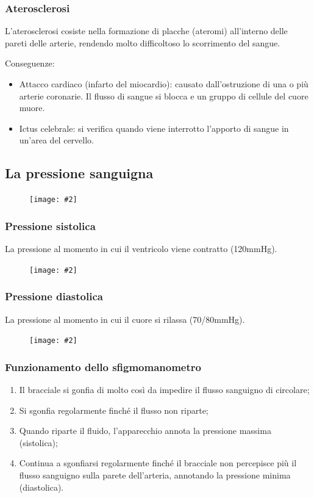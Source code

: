 \documentclass{article}
\newcommand{\cfig}[2]{
    \phantom{}
    \begin{figure}[ht!]
        \begin{center}
            \texttt{[image: \#2]}
        \end{center}
    \end{figure}
}
\begin{document}
\subsubsection{Aterosclerosi}
L'aterosclerosi cosiste nella formazione di placche (ateromi) all'interno delle pareti delle
arterie, rendendo molto difficoltoso lo scorrimento del sangue.

Conseguenze:
\begin{itemize}
    \item Attacco cardiaco (infarto del miocardio): causato dall'ostruzione di una o più
        arterie coronarie. Il flusso di sangue si blocca e un gruppo di cellule del cuore
        muore.
    \item Ictus celebrale: si verifica quando viene interrotto l'apporto di sangue in un'area
        del cervello.
\end{itemize}

\subsection{La pressione sanguigna}
\cfig{1}{media/pressione.png}

\newpage
\subsubsection{Pressione sistolica}
La pressione al momento in cui il ventricolo viene contratto (120mmHg).

\cfig{.4}{media/sistolica.png}

\subsubsection{Pressione diastolica}
La pressione al momento in cui il cuore si rilassa (70/80mmHg).

\cfig{.4}{media/diastolica.png}

\subsubsection{Funzionamento dello sfigmomanometro}
\begin{enumerate}
    \item Il bracciale si gonfia di molto così da impedire il flusso sanguigno di circolare;
    \item Si sgonfia regolarmente finché il flusso non riparte;
    \item Quando riparte il fluido, l'apparecchio annota la pressione massima (sistolica);
    \item Continua a sgonfiarsi regolarmente finché il bracciale non percepisce più il flusso
        sanguigno sulla parete dell'arteria, annotando la pressione minima (diastolica).
\end{enumerate}
\end{document}
